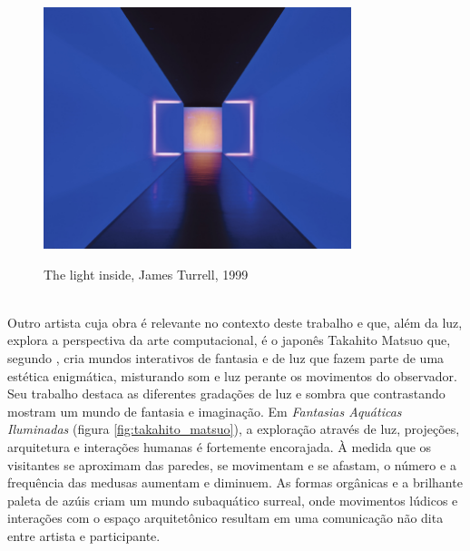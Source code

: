 \begin{figure}[H]
    \centering
    \caption{The light inside, James Turrell, 1999}
	\vspace*{0,2cm}
    \includegraphics[width=0.8\textwidth]{./04-figuras/james_turrell}
    \label{fig:james_turrell}
\end{figure}
\vspace*{-0,9cm}
{\raggedright {}}\\


Outro artista cuja obra é relevante no contexto deste trabalho e que, além da luz, explora a perspectiva da arte computacional, é o japonês Takahito Matsuo que, segundo , cria mundos interativos de fantasia e de luz que fazem parte de uma estética enigmática, misturando som e luz perante os movimentos do observador. Seu trabalho destaca as diferentes gradações de luz e sombra que contrastando mostram um mundo de fantasia e imaginação. Em \textit{Fantasias Aquáticas Iluminadas} (figura \ref{fig:takahito_matsuo}), a exploração através de luz, projeções, arquitetura e interações humanas é fortemente encorajada. À medida que os visitantes se aproximam das paredes, se movimentam e se afastam, o número e a frequência das medusas aumentam e diminuem. As formas orgânicas e a brilhante paleta de azúis criam um mundo subaquático surreal, onde movimentos lúdicos e interações com o espaço arquitetônico resultam em uma comunicação não dita entre artista e participante. 

